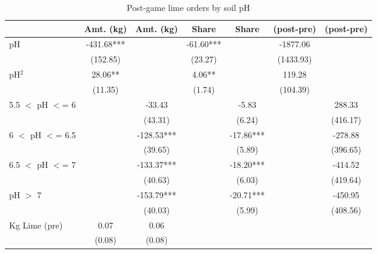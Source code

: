 \begin{table}[htbp]
\centering
\hspace*{-1.2cm}
\begin{threeparttable}
\caption{Post-game lime orders by soil pH}
\label{tab:A3}
\begin{tabular}{l cccccc}
\hline
\hline
                    &   Amt. (kg)   &   Amt. (kg)   &       Share   &       Share   &  (post-pre)   &  (post-pre)   \\
\hline
pH                  &     -431.68***&               &      -61.60***&               &    -1877.06   &               \\
                    &    (152.85)   &               &     (23.27)   &               &   (1433.93)   &               \\
pH$^2$              &       28.06** &               &        4.06** &               &      119.28   &               \\
                    &     (11.35)   &               &      (1.74)   &               &    (104.39)   &               \\
5.5 $<$ pH $<$= 6       &               &      -33.43   &               &       -5.83   &               &      288.33   \\
                    &               &     (43.31)   &               &      (6.24)   &               &    (416.17)   \\
6 $<$ pH $<$= 6.5       &               &     -128.53***&               &      -17.86***&               &     -278.88   \\
                    &               &     (39.65)   &               &      (5.89)   &               &    (396.65)   \\
6.5 $<$ pH $<$= 7       &               &     -133.37***&               &      -18.20***&               &     -414.52   \\
                    &               &     (40.63)   &               &      (6.03)   &               &    (419.64)   \\
pH $>$ 7              &               &     -153.79***&               &      -20.71***&               &     -450.95   \\
                    &               &     (40.03)   &               &      (5.99)   &               &    (408.56)   \\
Kg Lime (pre)       &        0.07   &        0.06   &               &               &               &               \\
                    &      (0.08)   &      (0.08)   &               &               &               &               \\

\end{tabular}
\end{threeparttable}
\end{table}
